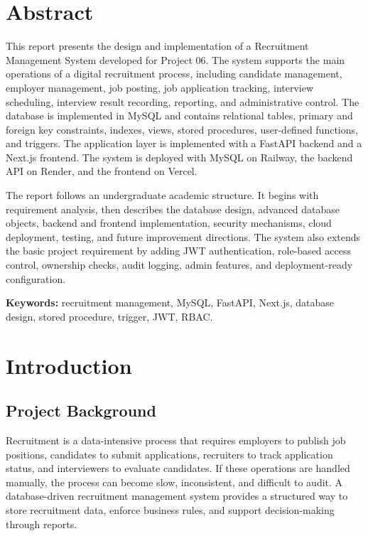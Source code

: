 \documentclass[11pt,a4paper]{report}
\newcommand{\projectname}{Recruitment Management System}
\begin{document}

\chapter*{Abstract}

This report presents the design and implementation of a \projectname{} developed for Project 06. The system supports the main operations of a digital recruitment process, including candidate management, employer management, job posting, job application tracking, interview scheduling, interview result recording, reporting, and administrative control. The database is implemented in MySQL and contains relational tables, primary and foreign key constraints, indexes, views, stored procedures, user-defined functions, and triggers. The application layer is implemented with a FastAPI backend and a Next.js frontend. The system is deployed with MySQL on Railway, the backend API on Render, and the frontend on Vercel.

The report follows an undergraduate academic structure. It begins with requirement analysis, then describes the database design, advanced database objects, backend and frontend implementation, security mechanisms, cloud deployment, testing, and future improvement directions. The system also extends the basic project requirement by adding JWT authentication, role-based access control, ownership checks, audit logging, admin features, and deployment-ready configuration.

\noindent\textbf{Keywords:} recruitment management, MySQL, FastAPI, Next.js, database design, stored procedure, trigger, JWT, RBAC.

\tableofcontents
\clearpage
{}

\chapter{Introduction}

\section{Project Background}

Recruitment is a data-intensive process that requires employers to publish job positions, candidates to submit applications, recruiters to track application status, and interviewers to evaluate candidates. If these operations are handled manually, the process can become slow, inconsistent, and difficult to audit. A database-driven recruitment management system provides a structured way to store recruitment data, enforce business rules, and support decision-making through reports.
\end{document}
